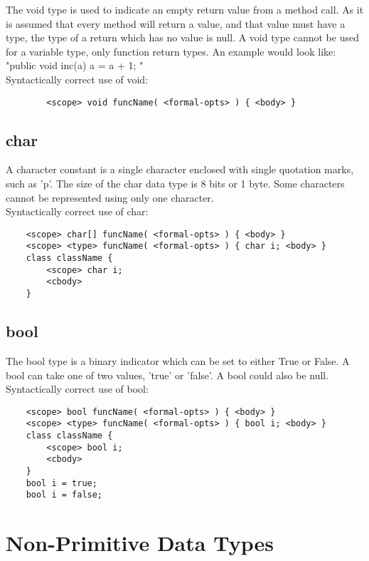 \begin{homeworkProblem}
	The void type is used to indicate an empty return value from a method call. As it is assumed that every method will return a value, and that value must have a type, the type of a return which has no value is null. A void type cannot be used for a variable type, only function return types. An example would look like: "public void inc(a) { a = a + 1; }" \\

	Syntactically correct use of void:


\begin{verbatim}
		<scope> void funcName( <formal-opts> ) { <body> }
	\end{verbatim}


	\subsection{char}

	A character constant is a single character enclosed with single quotation marks, such as 'p'. The size of the char data type is 8 bits or 1 byte. Some characters cannot be represented using only one character.\\

	Syntactically correct use of char:


	\begin{verbatim}
	<scope> char[] funcName( <formal-opts> ) { <body> }
	<scope> <type> funcName( <formal-opts> ) { char i; <body> }
	class className {
		<scope> char i;
		<cbody>
	}
	\end{verbatim}


	\subsection{bool}

	The bool type is a binary indicator which can be set to either True or False. A bool can take one of two values, 'true' or 'false'. A bool could also be null.\\

	Syntactically correct use of bool:

	\begin{verbatim}
	<scope> bool funcName( <formal-opts> ) { <body> }
	<scope> <type> funcName( <formal-opts> ) { bool i; <body> }
	class className {
		<scope> bool i;
		<cbody>
	}
	bool i = true;
	bool i = false;
	\end{verbatim}


	\section{Non-Primitive Data Types}

\end{homeworkProblem}
